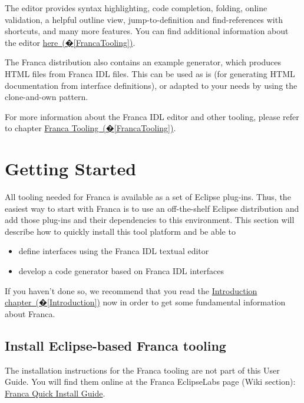 \documentclass[a4paper,10pt]{scrreprt}
\newlength{\XdocItemIndent}
\begin{document}
The editor provides syntax highlighting,
code completion, folding, online validation, a helpful outline view,
jump-to-definition and find-references with shortcuts, and many more features.
You can find additional information about the editor \hyperref[FrancaTooling]{here~(�\ref*{FrancaTooling})}.

The Franca distribution also contains an example generator, which produces
HTML files from Franca IDL files. This can be used as is (for generating 
HTML documentation from interface definitions), or adapted to your needs by
using the clone-and-own pattern. 

For more information about the Franca IDL editor and other tooling,
please refer to chapter \hyperref[FrancaTooling]{Franca Tooling~(�\ref*{FrancaTooling})}.


\chapter{Getting Started}
\label{GettingStarted}
All tooling needed for Franca is available as a set of Eclipse plug-ins.
Thus, the easiest way to start with Franca is to use an off-the-shelf Eclipse
distribution and add those plug-ins and their dependencies to this environment.
This section will describe how to quickly install this tool platform and be able to 
\setlength{\XdocItemIndent}{\textwidth}
\begin{itemize}
\addtolength{\XdocItemIndent}{-2.5em}
\item \begin{minipage}[t]{\XdocItemIndent}
define interfaces using the Franca IDL textual editor

\end{minipage}
\item \begin{minipage}[t]{\XdocItemIndent}
develop a code generator based on Franca IDL interfaces

\end{minipage}
\end{itemize}
\addtolength{\XdocItemIndent}{2.5em}

If you haven't done so, we recommend that you read the \hyperref[Introduction]{Introduction chapter~(�\ref*{Introduction})}
now in order to get some fundamental information about Franca.

\section{Install Eclipse-based Franca tooling}
\label{GettingStarted_InstallBinary}
The installation instructions for the Franca tooling are not part of this 
User Guide. You will find them online at the Franca EclipseLabs page (Wiki section):
\href{http://code.google.com/a/eclipselabs.org/p/franca/wiki/FrancaQuickInstallGuide}{Franca Quick Install
Guide}.
\end{document}
